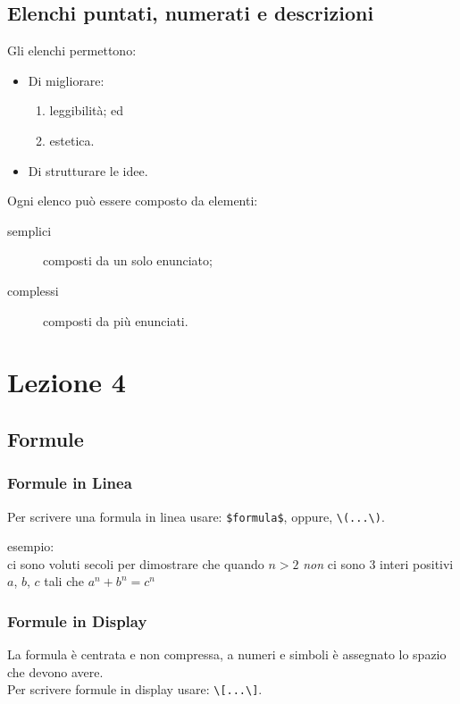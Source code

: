 \documentclass{article}
\begin{document}
        \section{Elenchi puntati, numerati e descrizioni}
            Gli elenchi permettono:
            \begin{itemize}
                \item Di migliorare:
                \begin{enumerate}
                    \item leggibilità; ed
                    \item estetica.
                \end{enumerate}
                \item Di strutturare le idee.
            \end{itemize} 
            Ogni elenco può essere
            composto da elementi:
            \begin{description}
                \item [semplici] composti da un solo enunciato;
                \item [complessi] composti da più enunciati.
            \end{description}


    \chapter{Lezione 4}

            \section{Formule}
                \subsection{Formule in Linea}
                    Per scrivere una formula in linea usare: \verb!$formula$!, oppure, \verb!\(...\)!.

                    esempio: \\
                        ci sono voluti secoli per dimostrare che quando $n > 2$ \emph{non} ci sono 
                        3 interi positivi $a$, $b$, $c$ tali che $a^n+b^n=c ^n$

                \subsection{Formule in Display}
                    La formula è centrata e non compressa, a numeri e simboli è
                    assegnato lo spazio che devono avere. \\
                    Per scrivere formule in display usare: \verb!\[...\]!.
                    
\end{document}
